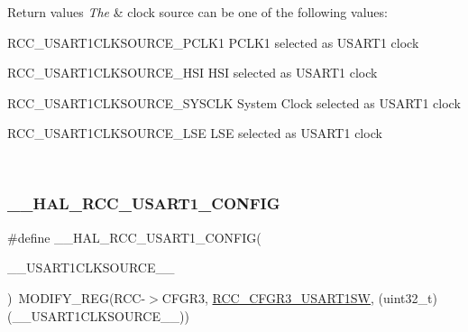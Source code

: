 \begin{DoxyRetVals}{Return values}
{\em The} & clock source can be one of the following values\+: \begin{DoxyItemize}
\item R\+C\+C\+\_\+\+U\+S\+A\+R\+T1\+C\+L\+K\+S\+O\+U\+R\+C\+E\+\_\+\+P\+C\+L\+K1 P\+C\+L\+K1 selected as U\+S\+A\+R\+T1 clock \item R\+C\+C\+\_\+\+U\+S\+A\+R\+T1\+C\+L\+K\+S\+O\+U\+R\+C\+E\+\_\+\+H\+SI H\+SI selected as U\+S\+A\+R\+T1 clock \item R\+C\+C\+\_\+\+U\+S\+A\+R\+T1\+C\+L\+K\+S\+O\+U\+R\+C\+E\+\_\+\+S\+Y\+S\+C\+LK System Clock selected as U\+S\+A\+R\+T1 clock \item R\+C\+C\+\_\+\+U\+S\+A\+R\+T1\+C\+L\+K\+S\+O\+U\+R\+C\+E\+\_\+\+L\+SE L\+SE selected as U\+S\+A\+R\+T1 clock \end{DoxyItemize}
\\
\hline
\end{DoxyRetVals}
\mbox{\label{group___r_c_c___u_s_a_r_tx___clock___config_gad24b5e0af45000967f8fc72f2d1ee8b4}} 
\subsubsection{\texorpdfstring{\+\_\+\+\_\+\+H\+A\+L\+\_\+\+R\+C\+C\+\_\+\+U\+S\+A\+R\+T1\+\_\+\+C\+O\+N\+F\+IG}{\_\_HAL\_RCC\_USART1\_CONFIG}}
{\footnotesize\ttfamily \#define \+\_\+\+\_\+\+H\+A\+L\+\_\+\+R\+C\+C\+\_\+\+U\+S\+A\+R\+T1\+\_\+\+C\+O\+N\+F\+IG(\begin{DoxyParamCaption}\item[{}]{\+\_\+\+\_\+\+U\+S\+A\+R\+T1\+C\+L\+K\+S\+O\+U\+R\+C\+E\+\_\+\+\_\+ }\end{DoxyParamCaption})~M\+O\+D\+I\+F\+Y\+\_\+\+R\+EG(R\+CC-\/$>$C\+F\+G\+R3, \hyperlink{group___peripheral___registers___bits___definition_gab7ecf61cefe76571a3492ec9f9df6407}{R\+C\+C\+\_\+\+C\+F\+G\+R3\+\_\+\+U\+S\+A\+R\+T1\+SW}, (uint32\+\_\+t)(\+\_\+\+\_\+\+U\+S\+A\+R\+T1\+C\+L\+K\+S\+O\+U\+R\+C\+E\+\_\+\+\_\+))}



